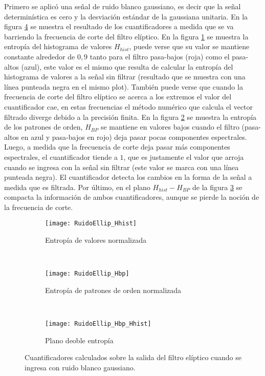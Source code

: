 Primero se aplicó una señal de ruido blanco gaussiano, es decir que la señal determinística es cero y la desviación estándar de la gaussiana unitaria.
En la figura \ref{fig:ellip} se muestra el resultado de los cuantificadores a medida que se va barriendo la frecuencia de corte del filtro elíptico.
En la figura \ref{subfig:ellip_Hhist} se muestra la entropía del histograma de valores $H_{hist}$, puede verse que su valor se mantiene constante alrededor de $0,9$ tanto para el filtro pasa-bajos (roja) como el pasa-altos (azul), este valor es el mismo que resulta de calcular la entropía del histograma de valores a la señal sin filtrar (resultado que se muestra con una línea punteada negra en el mismo plot). También puede verse que cuando la frecuencia de corte del filtro elíptico se acerca a los extremos el valor del cuantificador cae, en estas frecuencias el método numérico que calcula el vector filtrado diverge debido a la precisión finita.
En la figura \ref{subfig:ellip_Hbp} se muestra la entropía de los patrones de orden, $H_{BP}$ se mantiene en valores bajos cuando el filtro (pasa-altos en azul y pasa-bajos en rojo) deja pasar pocas componentes espectrales. Luego, a medida que la frecuencia de corte deja pasar más componentes espectrales, el cuantificador tiende a $1$, que es justamente el valor que arroja cuando se ingresa con la señal sin filtrar (este valor se marca con una línea punteada negra).
El cuantificador detecta los cambios en la forma de la señal a medida que es filtrada.
Por último, en el plano $H_{hist} - H_{BP}$ de la figura \ref{subfig:ellip_HbpHhist} se compacta la información de ambos cuantificadores, aunque se pierde la noción de la frecuencia de corte.

\begin{figure}[h]
    \centering
    \begin{subfigure}[t]{0.32\textwidth}
        \texttt{[image: RuidoEllip\_Hhist]}
        \caption{Entropía de valores normalizada}
        \label{subfig:ellip_Hhist}
    \end{subfigure}
    ~ %
    \begin{subfigure}[t]{0.32\textwidth}
        \texttt{[image: RuidoEllip\_Hbp]}
        \caption{Entropía de patrones de orden normalizada}
        \label{subfig:ellip_Hbp}
    \end{subfigure}
    ~ %
    \begin{subfigure}[t]{0.32\textwidth}
        \texttt{[image: RuidoEllip\_Hbp\_Hhist]}
        \caption{Plano deoble entropía}
        \label{subfig:ellip_HbpHhist}
    \end{subfigure}
    \caption{Cuantificadores calculados sobre la salida del filtro elíptico cuando se ingresa con ruido blanco gaussiano.}\label{fig:ellip}
\end{figure}

